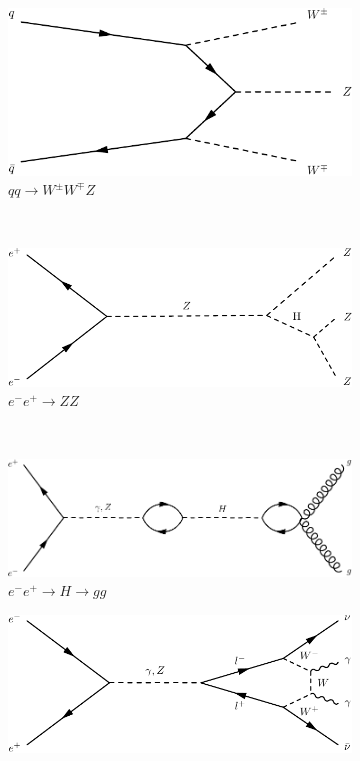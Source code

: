\begin{figure}[h]
\begin{subfigure}[b]{0.3\textwidth}
    \includegraphics[width=\textwidth]{../dia/10.pdf}
    \caption{$qq\rightarrow W^{\pm}W^{\mp}Z$}
    \label{fey:10}
  \end{subfigure}%
  ~
  \begin{subfigure}[b]{0.3\textwidth}
    \includegraphics[width=\textwidth]{../dia/11.pdf}
    \caption{$e^-e^+\rightarrow ZZ$}
    \label{fey:11}
  \end{subfigure}%
  ~
  \begin{subfigure}[b]{0.3\textwidth}
    \includegraphics[width=\textwidth]{../dia/12.pdf}
    \caption{$e^-e^+\rightarrow H \rightarrow gg$}
    \label{fey:12}
  \end{subfigure}
  \newline
  \newline
  \begin{subfigure}[b]{0.3\textwidth}
    \includegraphics[width=\textwidth]{../dia/13.pdf}

\end{subfigure}
\end{figure}
